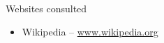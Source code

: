 \cleardoublepage
{}
{}
\printbibliography[title=References]
\nocite{*}
\vspace{2.5cm}
\begin{Large}Websites consulted\end{Large}
\begin{itemize}
\item Wikipedia -- \url{www.wikipedia.org}
\end{itemize}

